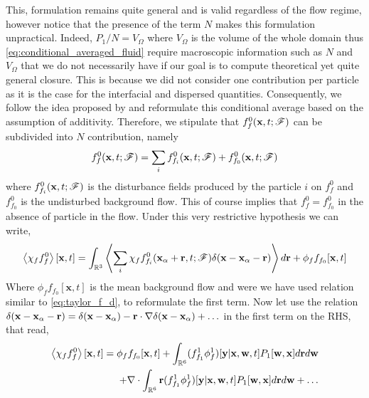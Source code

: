 This, formulation remains quite general and is valid regardless of the flow regime, however notice that the presence of the term $N$ makes this formulation unpractical. 
Indeed, $P_1 /N = V_\Omega$ where $V_\Omega$ is the volume of the whole domain thus \ref{eq:conditional_averaged_fluid} require macroscopic information such as $N$ and $V_\Omega$ that we do not necessarily have if our goal is to compute theoretical yet quite general closure. 
This is because we did not consider one contribution per particle as it is the case for the interfacial and dispersed quantities.
Consequently, we follow the idea proposed by \citet{batchelor1972sedimentation} and reformulate this conditional average based on the assumption of additivity.
Therefore, we stipulate that $f_f^0(\textbf{x},t;\mathscr{F})$ can be subdivided into $N$ contribution, namely  
\begin{equation}
    f_f^0(\textbf{x},t;\mathscr{F})
    = 
    \sum_i
    f_{f_i}^0(\textbf{x},t;\mathscr{F})
    + f_{f_0}^0(\textbf{x},t;\mathscr{F})
\end{equation}
where $f_{f_i}^0(\textbf{x},t;\mathscr{F})$ is the disturbance fields produced by the particle $i$ on $f_f^0$ and $f_{f_0}^0$ is the undisturbed background flow. 
This of course implies that $f_{f}^0 = f_{f_0}^0$ in the absence of particle in the flow. 
Under this very restrictive hypothesis we can write, 
\begin{equation}
    \left<\chi_f f_f^0\right>[\textbf{x},t]
    = 
    \int_{\mathbb{R}^3} 
    \left<
        \sum_i
    \chi_f f_{f_i}^0(\textbf{x}_\alpha + \textbf{r},t;\mathscr{F}) \delta(\textbf{x} - \textbf{x}_\alpha - \textbf{r})\right>d\textbf{r}
    + \phi_f f_{f_0}[\textbf{x},t]
\end{equation}
Where $\phi_f f_{f_0}[\textbf{x},t]$ is the mean background flow and were we have used relation similar to \ref{eq:taylor_f_d}, to reformulate the first term. 
Now let use the relation  $\delta(\textbf{x} - \textbf{x}_\alpha - \textbf{r}) =\delta(\textbf{x} - \textbf{x}_\alpha) - \textbf{r}\cdot \mathbf{\nabla}\delta(\textbf{x} - \textbf{x}_\alpha)+ \ldots$ in the first term on the RHS, that read,
\begin{align}
    \left<\chi_f f_f^0\right>[\textbf{x},t]
    = 
    \phi_f f_{f_0}[\textbf{x},t]
    + 
    \int_{\mathbb{R}^6} 
    (f_{f_1}^1\phi_f^1) [\textbf{y}|\textbf{x},\textbf{w},t] P_1[\textbf{w},\textbf{x}]
    d\textbf{r}
    d\textbf{w}\\
    + 
    \mathbf{\nabla}\cdot 
    \int_{\mathbb{R}^6} 
    \textbf{r}
    (f_{f_1}^1\phi_f^1) [\textbf{y}|\textbf{x},\textbf{w},t] P_1[\textbf{w},\textbf{x}]
    d\textbf{r}
    d\textbf{w}
    + \ldots
    \label{eq:f_f_1_def}
\end{align}
